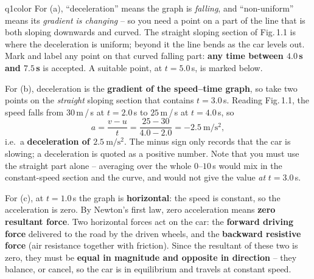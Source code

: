 \documentclass[11pt,a4paper]{article}
\begin{document}
\begin{ansbox}{q1color}
For (a), ``deceleration'' means the graph is \emph{falling}, and ``non-uniform'' means its \emph{gradient is changing} -- so you need a point on a part of the line that is both sloping downwards and curved. The straight sloping section of Fig.\,1.1 is where the deceleration is uniform; beyond it the line bends as the car levels out. Mark and label any point on that curved falling part: \textbf{any time between $4.0$\,s and $7.5$\,s} is accepted. A suitable point, at $t = 5.0$\,s, is marked below.
\begin{center}
\end{center}

For (b), deceleration is the \textbf{gradient of the speed--time graph}, so take two points on the \emph{straight} sloping section that contains $t = 3.0$\,s. Reading Fig.\,1.1, the speed falls from $30$\,m\,/\,s at $t = 2.0$\,s to $25$\,m\,/\,s at $t = 4.0$\,s, so
\[ a = \frac{v - u}{t} = \frac{25 - 30}{4.0 - 2.0} = -2.5\ \mathrm{m/s^2}, \]
i.e.\ a \textbf{deceleration of $2.5\ \mathrm{m/s^2}$}. The minus sign only records that the car is slowing; a deceleration is quoted as a positive number. Note that you must use the straight part alone -- averaging over the whole $0$--$10$\,s would mix in the constant-speed section and the curve, and would not give the value \emph{at} $t = 3.0$\,s.

For (c), at $t = 1.0$\,s the graph is \textbf{horizontal}: the speed is constant, so the acceleration is zero. By Newton's first law, zero acceleration means \textbf{zero resultant force}. Two horizontal forces act on the car: the \textbf{forward driving force} delivered to the road by the driven wheels, and the \textbf{backward resistive force} (air resistance together with friction). Since the resultant of these two is zero, they must be \textbf{equal in magnitude and opposite in direction} -- they balance, or cancel, so the car is in equilibrium and travels at constant speed.
\end{ansbox}
\end{document}
